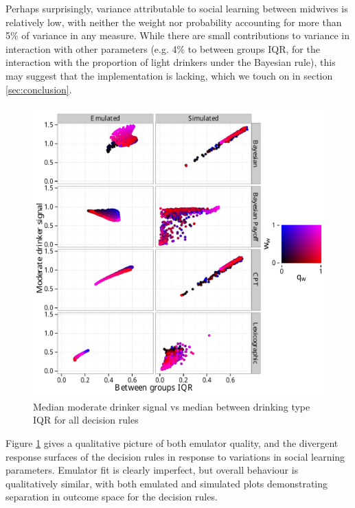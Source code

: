 Perhaps surprisingly, variance attributable to social learning between midwives is relatively low, with neither the weight nor probability accounting for more than 5\% of variance in any measure. While there are small contributions to variance in interaction with other parameters (e.g. 4\% to between groups IQR, for the interaction with the proportion of light drinkers under the Bayesian rule), this may suggest that the implementation is lacking, which we touch on in section \ref{sec:conclusion}.

\begin{figure}[H]
\begin{adjustbox}{center}\includegraphics[width=119mm]{figures/sharing_emulated_simulated}\end{adjustbox}
\caption{Median moderate drinker signal vs median between drinking type IQR for all decision rules}
\label{fig:outcome_plots}
\end{figure}

Figure \ref{fig:outcome_plots} gives a qualitative picture of both emulator quality, and the divergent response surfaces of the decision rules in response to variations in social learning parameters. Emulator fit is clearly imperfect, but overall behaviour is qualitatively similar, with both emulated and simulated plots demonstrating separation in outcome space for the decision rules.

